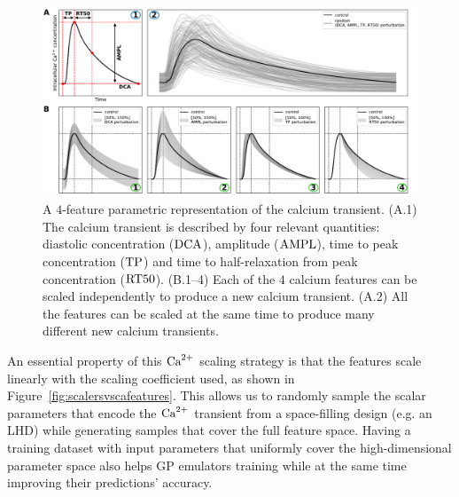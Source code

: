 \begin{figure}[ht!]
    \myfloatalign
    \includegraphics[width=\textwidth]{figures/chapter06/ca_biomarkers_and_scaling_explained_with_labels.pdf}
    \caption{A $4$-feature parametric representation of the calcium transient. (A.1) The calcium transient is described by four relevant quantities: diastolic concentration ($\textrm{DCA}$), amplitude ($\textrm{AMPL}$), time to peak concentration ($\textrm{TP}$) and time to half-relaxation from peak concentration ($\textrm{RT50}$). (B.1--4) Each of the $4$ calcium features can be scaled independently to produce a new calcium transient. (A.2) All the features can be scaled at the same time to produce many different new calcium transients.}
    \label{fig:algintopractice}
\end{figure}

\vspace{0.2cm}
An essential property of this $\textrm{Ca}^{2+}$ scaling strategy is that the features scale linearly with the scaling coefficient used, as shown in Figure~\ref{fig:scalersvscafeatures}. This allows us to randomly sample the scalar parameters that encode the $\textrm{Ca}^{2+}$ transient from a space-filling design (e.g. an LHD) while generating samples that cover the full feature space. Having a training dataset with input parameters that uniformly cover the high-dimensional parameter space also helps GP emulators training while at the same time improving their predictions' accuracy.

